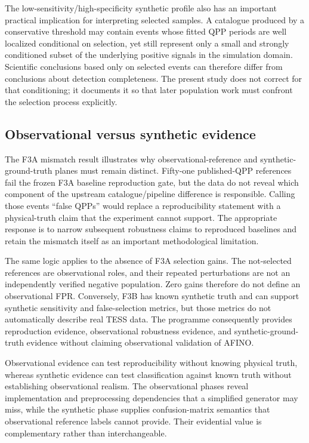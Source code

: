 \documentclass[manuscript,linenumbers]{aastex702}
\begin{document}
The low-sensitivity/high-specificity synthetic profile also has an important practical implication for interpreting selected samples. A catalogue produced by a conservative threshold may contain events whose fitted QPP periods are well localized conditional on selection, yet still represent only a small and strongly conditioned subset of the underlying positive signals in the simulation domain. Scientific conclusions based only on selected events can therefore differ from conclusions about detection completeness. The present study does not correct for that conditioning; it documents it so that later population work must confront the selection process explicitly.

\subsection{Observational versus synthetic evidence}
The F3A mismatch result illustrates why observational-reference and synthetic-ground-truth planes must remain distinct. Fifty-one published-QPP references fail the frozen F3A baseline reproduction gate, but the data do not reveal which component of the upstream catalogue/pipeline difference is responsible. Calling those events ``false QPPs'' would replace a reproducibility statement with a physical-truth claim that the experiment cannot support. The appropriate response is to narrow subsequent robustness claims to reproduced baselines and retain the mismatch itself as an important methodological limitation.

The same logic applies to the absence of F3A selection gains. The not-selected references are observational roles, and their repeated perturbations are not an independently verified negative population. Zero gains therefore do not define an observational FPR. Conversely, F3B has known synthetic truth and can support synthetic sensitivity and false-selection metrics, but those metrics do not automatically describe real TESS data. The programme consequently provides reproduction evidence, observational robustness evidence, and synthetic-ground-truth evidence without claiming observational validation of AFINO.

Observational evidence can test reproducibility without knowing physical truth, whereas synthetic evidence can test classification against known truth without establishing observational realism. The observational phases reveal implementation and preprocessing dependencies that a simplified generator may miss, while the synthetic phase supplies confusion-matrix semantics that observational reference labels cannot provide. Their evidential value is complementary rather than interchangeable.
\end{document}
